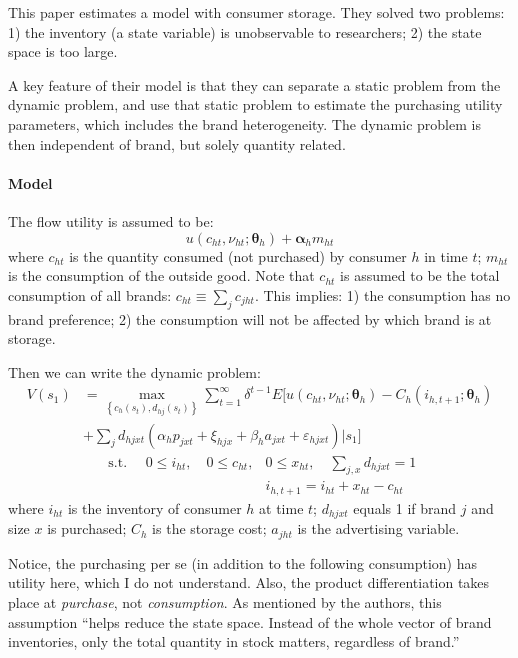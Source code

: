 \textbf{}

This paper estimates a model with consumer storage. 
They solved two problems: 
1) the inventory (a state variable) is unobservable to researchers;
2) the state space is too large.

A key feature of their model is that they can separate a static problem from the dynamic problem, and use that static problem to estimate the purchasing utility parameters, which includes the brand heterogeneity.
The dynamic problem is then independent of brand, but solely quantity related.

\paragraph{Model}

The flow utility is assumed to be:
\[
    u\left(c_{h t}, \nu_{h t} ; 
    \boldsymbol{\theta}_{h}\right)+\boldsymbol{\alpha}_{h} m_{h t}
\]
where $c_{ht}$ is the quantity consumed (not purchased) by consumer $h$ in time $t$; 
$m_{ht}$ is the consumption of the outside good.
Note that $c_{ht}$ is assumed to be the total consumption of all brands: 
$c_{ht} \equiv \sum_{j} c_{jht}$. 
This implies: 
1) the consumption has no brand preference;
2) the consumption will not be affected by which brand is at storage.

Then we can write the dynamic problem:
\begin{align*}
    V\left(s_{1}\right)
    &{=\max _{\left\{c_{h}\left(s_{t}\right), d_{h j}\left(s_{t}\right)\right\}} \sum_{t=1}^{\infty} \delta^{t-1} E[u\left(c_{h t}, \nu_{h t} ; \boldsymbol{\theta}_{h}\right)-C_{h}\left(i_{h, t+1} ; \boldsymbol{\theta}_{h}\right)}\\
    & +\sum_{j} d_{h j x t}\left(\alpha_{h} p_{j x t}+\xi_{h j x}+\beta_{h} a_{j x t}+\varepsilon_{h j x t}\right) | s_{1}]
\end{align*}
\[
    \begin{array}{ll}{\text { s.t. } \quad 0 \leq i_{h t}, \quad 0 \leq c_{h t},} & {0 \leq x_{h t}, \quad \sum_{j, x} d_{h j x t}=1} \\ {} & {i_{h, t+1}=i_{h t}+x_{h t}-c_{h t}}\end{array}
\]
where $i_{ht}$ is the inventory of consumer $h$ at time $t$; 
$d_{hjxt}$ equals 1 if brand $j$ and size $x$ is purchased;
$C_h$ is the storage cost;
$a_{jht}$ is the advertising variable.

Notice, the purchasing per se (in addition to the following consumption) has utility here, which I do not understand.
Also, the product differentiation takes place at \textit{purchase}, not \textit{consumption}.
As mentioned by the authors, this assumption ``helps reduce the state space. Instead of the whole vector of brand inventories, only the total quantity in stock matters, regardless of brand.''


